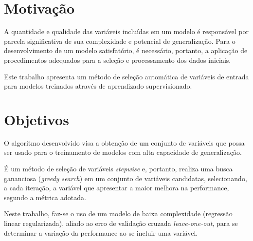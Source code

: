 \section{Motivação}
A quantidade e qualidade das variáveis incluídas em um modelo é responsável por parcela significativa de sua complexidade e potencial de generalização. Para o desenvolvimento de um modelo satisfatório, é necessário, portanto, a aplicação de procedimentos adequados para a seleção e processamento dos dados iniciais.

Este trabalho apresenta um método de seleção automática de variáveis de entrada para modelos treinados através de aprendizado supervisionado.

\section{Objetivos}

 O algoritmo desenvolvido visa a obtenção de um conjunto de variáveis que possa ser usado para o treinamento de modelos com alta capacidade de generalização. 
 
 É um método de seleção de variáveis \textit{stepwise} e, portanto, realiza uma busca gananciosa (\textit{greedy search}) em um conjunto de variáveis candidatas, selecionando, a cada iteração, a variável que apresentar a maior melhora na performance, segundo a métrica adotada.
 
Neste trabalho, faz-se o uso de um modelo de baixa complexidade (regressão linear regularizada), aliado ao erro de validação cruzada \textit{leave-one-out}, para se determinar a variação da performance ao se incluir uma variável.